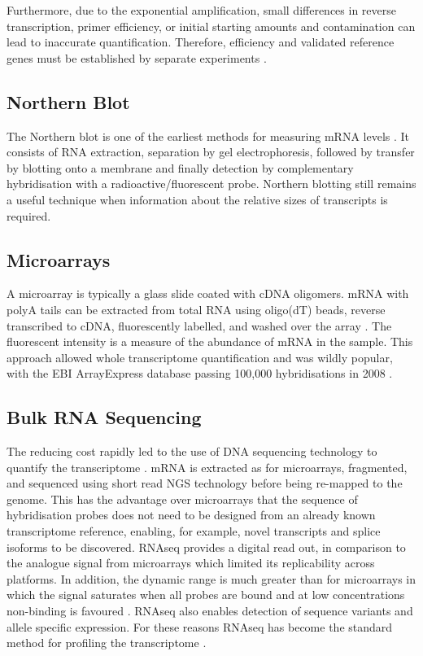 Furthermore, due to the exponential amplification, small differences in reverse transcription, primer efficiency, or initial starting amounts and contamination can lead to inaccurate quantification.
Therefore, efficiency and validated reference genes must be established by separate experiments \parencite{Bustin2009MIQE}.

\subsection{Northern Blot}
The Northern blot is one of the earliest methods for measuring mRNA levels \parencite{Alwine1977Method}.
It consists of RNA extraction, separation by gel electrophoresis, followed by transfer by blotting onto a membrane and finally detection by complementary hybridisation with a radioactive/fluorescent probe.
Northern blotting still remains a useful technique when information about the relative sizes of transcripts is required.

\subsection{Microarrays}
A microarray is typically a glass slide coated with cDNA oligomers.
mRNA with polyA tails can be extracted from total RNA using oligo(dT) beads, reverse transcribed to cDNA, fluorescently labelled, and washed over the array \parencite{Schena1995Quantitative, DeRisi1996Use, Schulze2001Navigating}.
The fluorescent intensity is a measure of the abundance of mRNA in the sample.
This approach allowed whole transcriptome quantification and was wildly popular, with the EBI ArrayExpress database passing 100,000 hybridisations in 2008 \parencite{Rustici2008Data}.

\subsection{Bulk RNA Sequencing}
The reducing cost rapidly led to the use of DNA sequencing technology to quantify the transcriptome \parencite{Mortazavi2008Mapping, Cloonan2008Stem, Wilhelm2008Dynamic, Lister2008Highly, Nagalakshmi2008Transcriptional}.
mRNA is extracted as for microarrays, fragmented, and sequenced using short read NGS technology before being re-mapped to the genome.
This has the advantage over microarrays that the sequence of hybridisation probes does not need to be designed from an already known transcriptome reference, enabling, for example, novel transcripts and splice isoforms to be discovered.
RNAseq provides a digital read out, in comparison to the analogue signal from microarrays which limited its replicability across platforms.
In addition, the dynamic range is much greater than for microarrays in which the signal saturates when all probes are bound and at low concentrations non-binding is favoured \parencite{Zhao2014Comparison}.
RNAseq also enables detection of sequence variants and allele specific expression.
For these reasons RNAseq has become the standard method for profiling the transcriptome \parencite{Stark2019RNA}.

